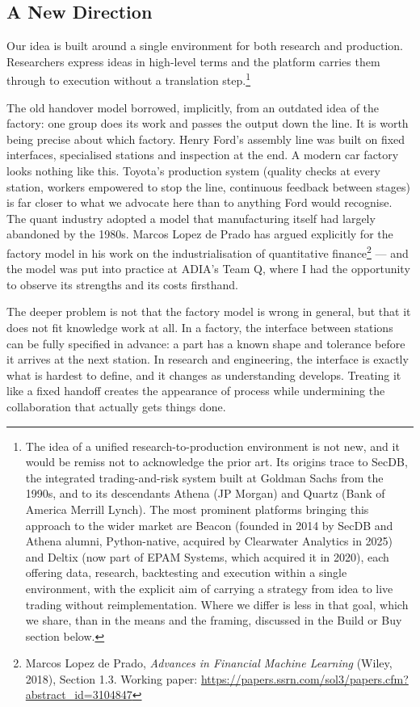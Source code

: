 \documentclass[
  11pt,
]{article}
\begin{document}
\subsection{A New Direction}\label{a-new-direction}

Our idea is built around a single environment for both research and
production. Researchers express ideas in high-level terms and the
platform carries them through to execution without a translation
step.\footnote{The idea of a unified research-to-production environment
  is not new, and it would be remiss not to acknowledge the prior art.
  Its origins trace to SecDB, the integrated trading-and-risk system
  built at Goldman Sachs from the 1990s, and to its descendants Athena
  (JP Morgan) and Quartz (Bank of America Merrill Lynch). The most
  prominent platforms bringing this approach to the wider market are
  Beacon (founded in 2014 by SecDB and Athena alumni, Python-native,
  acquired by Clearwater Analytics in 2025) and Deltix (now part of EPAM
  Systems, which acquired it in 2020), each offering data, research,
  backtesting and execution within a single environment, with the
  explicit aim of carrying a strategy from idea to live trading without
  reimplementation. Where we differ is less in that goal, which we
  share, than in the means and the framing, discussed in the Build or
  Buy section below.}

The old handover model borrowed, implicitly, from an outdated idea of
the factory: one group does its work and passes the output down the
line. It is worth being precise about which factory. Henry Ford's
assembly line was built on fixed interfaces, specialised stations and
inspection at the end. A modern car factory looks nothing like this.
Toyota's production system (quality checks at every station, workers
empowered to stop the line, continuous feedback between stages) is
far closer to what we advocate here than to anything Ford would
recognise. The quant industry adopted a model that manufacturing itself
had largely abandoned by the 1980s. Marcos Lopez de Prado has argued
explicitly for the factory model in his work on the industrialisation of
quantitative finance\footnote{Marcos Lopez de Prado, \emph{Advances in
  Financial Machine Learning} (Wiley, 2018), Section 1.3. Working paper:
  \url{https://papers.ssrn.com/sol3/papers.cfm?abstract_id=3104847}} ---
and the model was put into practice at ADIA's Team Q, where I had the
opportunity to observe its strengths and its costs firsthand.

The deeper problem is not that the factory model is wrong in general,
but that it does not fit knowledge work at all. In a factory, the
interface between stations can be fully specified in advance: a part has
a known shape and tolerance before it arrives at the next station. In
research and engineering, the interface is exactly what is hardest to
define, and it changes as understanding develops. Treating it like a
fixed handoff creates the appearance of process while undermining the
collaboration that actually gets things done.
\end{document}
